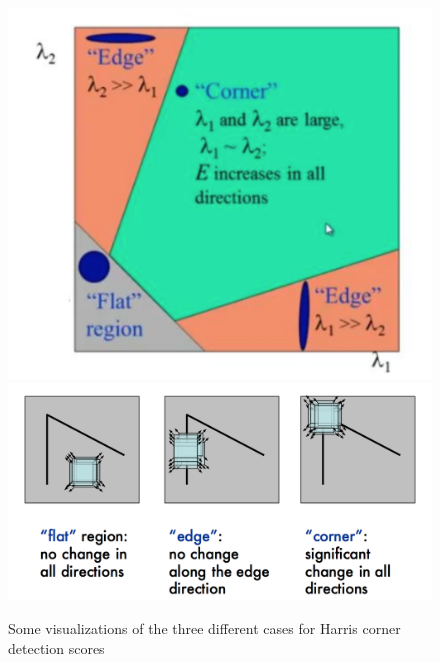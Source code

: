 \documentclass[a4paper, 12pt]{article}
\numberwithin{equation}{section}
\begin{document}
\begin{figure}
\centering
\includegraphics[scale=0.3]{h1}
\includegraphics[scale=0.3]{h2}
\caption{Some visualizations of the three different cases for Harris corner detection scores}
\end{figure}
\end{document}
